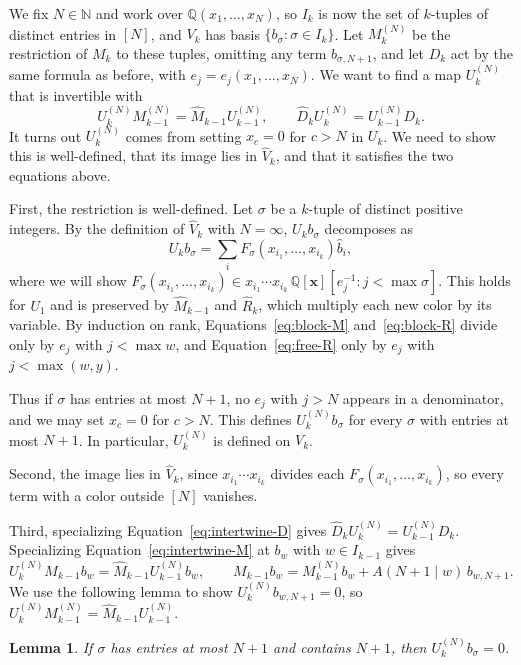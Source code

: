 \documentclass[12pt]{article}
\theoremstyle{plain}
\newtheorem{lemma}[theorem]{Lemma}
\theoremstyle{definition}
\theoremstyle{remark}
\newcommand{\bN}{\mathbb{N}}
\newcommand{\bQ}{\mathbb{Q}}
\begin{document}
We fix $N\in\bN$ and work over $\bQ(x_1,\dots,x_N)$, so $I_k$ is now
the set of $k$-tuples of distinct entries in $[N]$, and $V_k$ has basis
$\{b_\sigma:\sigma\in I_k\}$.
Let $M_k^{(N)}$ be the restriction of $M_k$ to these tuples, omitting any
term $b_{\sigma,N+1}$, and let $D_k$ act by the same formula as before,
with $e_j=e_j(x_1,\dots,x_N)$. We want to find a map $U_k^{(N)}$ that is invertible with
\[
U_k^{(N)}M_{k-1}^{(N)}=\hat M_{k-1}U_{k-1}^{(N)},
\qquad
\hat D_kU_k^{(N)}=U_{k-1}^{(N)}D_k.
\]
It turns out $U_k^{(N)}$ comes from setting $x_c=0$ for $c>N$ in $U_k$. We
need to show this is well-defined, that its image lies in $\hat V_k$, and
that it satisfies the two equations above.

First, the restriction is well-defined. Let $\sigma$ be a $k$-tuple of
distinct positive integers. By the definition of $\hat V_k$ with
$N=\infty$, $U_kb_\sigma$ decomposes as
\[
U_kb_\sigma=\sum_iF_\sigma(x_{i_1},\dots,x_{i_k})\hat b_i,\]
where we will show $F_\sigma(x_{i_1},\dots,x_{i_k})\in x_{i_1}\cdots x_{i_k}\,\bQ[\bm x][e_j^{-1}:j<\max\sigma]$.
This holds for $U_1$ and is preserved by $\hat M_{k-1}$ and
$\hat R_k$, which multiply each new color by its variable. By induction on
rank, Equations~\eqref{eq:block-M} and~\eqref{eq:block-R} divide only by
$e_j$ with $j<\max w$, and Equation~\eqref{eq:free-R} only by $e_j$ with
$j<\max(w,y)$.

Thus if $\sigma$ has entries at most $N+1$, no $e_j$ with
$j>N$ appears in a denominator, and we may set $x_c=0$ for $c>N$. This
defines $U_k^{(N)}b_\sigma$ for every $\sigma$ with entries at most $N+1$. In particular, $U_k^{(N)}$ is defined on $V_k$.

Second, the image lies in $\hat V_k$, since $x_{i_1}\cdots x_{i_k}$ divides
each $F_\sigma(x_{i_1},\dots,x_{i_k})$, so every term with a color outside
$[N]$ vanishes.

Third, specializing Equation~\eqref{eq:intertwine-D} gives
$\hat D_kU_k^{(N)}=U_{k-1}^{(N)}D_k$. Specializing
Equation~\eqref{eq:intertwine-M} at $b_w$ with $w\in I_{k-1}$ gives
\[
U_k^{(N)}M_{k-1}b_w=\hat M_{k-1}U_{k-1}^{(N)}b_w,
\qquad
M_{k-1}b_w=M_{k-1}^{(N)}b_w+A(N{+}1\mid w)\,b_{w,N+1}.
\]
We use the following lemma to show $U_k^{(N)}b_{w,N+1}=0$, so
$U_k^{(N)}M_{k-1}^{(N)}=\hat M_{k-1}U_{k-1}^{(N)}$.

\begin{lemma}\label{lem:vanish}
If $\sigma$ has entries at most $N+1$ and contains $N+1$, then $U^{(N)}_kb_\sigma=0$.
\end{lemma}
\end{document}
